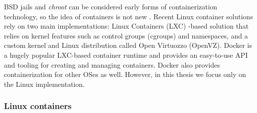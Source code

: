 \documentclass[english, 12pt, a4paper, sci, utf8, a-2b, online]{aaltothesis}
\begin{document}
BSD jails and \emph{chroot} can be considered early forms of containerization technology, so the idea of containers is not new \cite{combe2016docker}.
Recent Linux container solutions rely on two main implementations: Linux Containers (LXC) -based solution that relies on kernel features such as control groups (cgroups) and namespaces, and a custom kernel and Linux distribution called Open Virtuozzo (OpenVZ).
Docker \cite{docker} is a hugely popular LXC-based container runtime and provides an easy-to-use API and tooling for creating and managing containers.
Docker also provides containerization for other OSes as well.
However, in this thesis we focus only on the Linux implementation.

\subsubsection{Linux containers}
\end{document}
